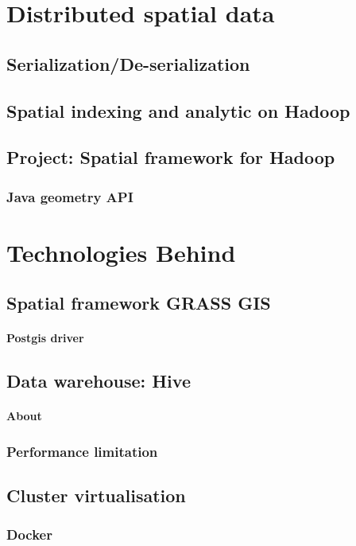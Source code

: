 \documentclass[a4paper,12pt,oneside]{report}
\begin{document}
\section{Distributed spatial data}
		\subsection{Serialization/De-serialization}
		\subsection{Spatial indexing and analytic on Hadoop}
		\subsection{Project: Spatial framework for Hadoop}
			\subsubsection{Java geometry API}

\section{Technologies Behind}
	\subsection{Spatial framework GRASS GIS}
		\paragraph*{Postgis driver}
	\subsection{Data warehouse: Hive}
		\paragraph{About}
		\subsubsection{Performance limitation}
	\subsection{Cluster virtualisation}
		\subsubsection{Docker}
\end{document}
